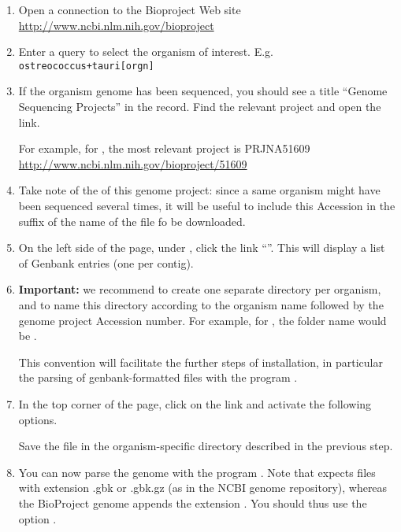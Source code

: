 \begin{enumerate}
\item Open a connection to the Bioproject Web site \\
  \url{http://www.ncbi.nlm.nih.gov/bioproject}

\item Enter a query to select the organism of interest.
  E.g. \texttt{ostreococcus+tauri[orgn]}

\item If the organism genome has been sequenced, you should see a
  title ``Genome Sequencing Projects'' in the record. Find the
  relevant project and open the link.

  For example, for
  , the most relevant project is PRJNA51609 \\
  \url{http://www.ncbi.nlm.nih.gov/bioproject/51609}

\item Take note of the  of this genome project:
  since a same organism might have been sequenced several times, it
  will be useful to include this Accession in the suffix of the name
  of the file fo be downloaded.

\item On the left side of the page, under , click the link ``''. This will display a list of Genbank entries (one per contig).

\item \textbf{Important:} we recommend to create one separate
  directory per organism, and to name this directory according to the
  organism name followed by the genome project Accession number. For
  example, for , the folder name would be
  .

  This convention will facilitate the further steps of installation,
  in particular the parsing of genbank-formatted files with the
  program .

\item In the top corner of the page, click on the 
  link and activate the following options.


  Save the file in the organism-specific directory described in the
  previous step.

\item You can now parse the genome with the program
  . Note that 
  expects files with extension .gbk or .gbk.gz (as in the NCBI genome
  repository), whereas the BioProject genome appends the extension
  . You should thus use the option .


\end{enumerate}
